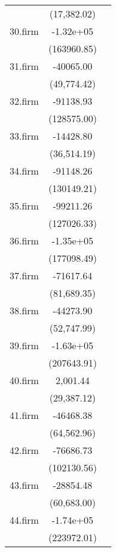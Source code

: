 {\begin{tabular}{l*{2}{c}}
            & (17,382.02)  &              \\
30.firm     &   -1.32e+05  &              \\
            & (163960.85)  &              \\
31.firm     &   -40065.00  &              \\
            & (49,774.42)  &              \\
32.firm     &   -91138.93  &              \\
            & (128575.00)  &              \\
33.firm     &   -14428.80  &              \\
            & (36,514.19)  &              \\
34.firm     &   -91148.26  &              \\
            & (130149.21)  &              \\
35.firm     &   -99211.26  &              \\
            & (127026.33)  &              \\
36.firm     &   -1.35e+05  &              \\
            & (177098.49)  &              \\
37.firm     &   -71617.64  &              \\
            & (81,689.35)  &              \\
38.firm     &   -44273.90  &              \\
            & (52,747.99)  &              \\
39.firm     &   -1.63e+05  &              \\
            & (207643.91)  &              \\
40.firm     &    2,001.44  &              \\
            & (29,387.12)  &              \\
41.firm     &   -46468.38  &              \\
            & (64,562.96)  &              \\
42.firm     &   -76686.73  &              \\
            & (102130.56)  &              \\
43.firm     &   -28854.48  &              \\
            & (60,683.00)  &              \\
44.firm     &   -1.74e+05  &              \\
            & (223972.01)  &              \\

\end{tabular}}
